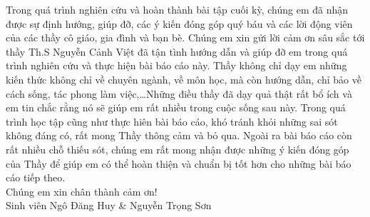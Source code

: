 
\begin{acknowledgements}
	\addchaptertocentry{\acknowledgementname}
	\thispagestyle{empty}
	Trong quá trình nghiên cứu và hoàn thành bài tập cuối kỳ, chúng em đã nhận được sự định hướng, giúp đỡ, các ý kiến đóng góp quý báu và các lời động viên của các thầy cô giáo, gia đình và bạn bè.
	Chúng em xin gửi lời cảm ơn sâu sắc tới thầy Th.S Nguyễn Cảnh Việt đã tận tình hướng dẫn và giúp đỡ em trong quá trình nghiên cứu và thực hiện bài báo cáo này. Thầy không chỉ dạy em những kiến thức không chỉ về chuyên ngành, về môn học, mà còn hướng dẫn, chỉ bảo về cách sống, tác phong làm việc,…Những điều thầy đã dạy quả thật rất bổ ích và em tin chắc rằng nó sẽ giúp em rất nhiều trong cuộc sống sau này.
	Trong quá trình học tập cũng như thực hiên bài báo cáo, khó tránh khỏi những sai sót không đáng có, rất mong Thầy thông cảm và bỏ qua. Ngoài ra bài báo cáo còn rất nhiều chỗ thiếu sót, chúng em rất mong nhận được những ý kiến đóng góp của Thầy để giúp em có thể hoàn thiện và chuẩn bị tốt hơn cho những bài báo cáo tiếp theo.\\
	Chúng em xin chân thành cảm ơn!\\
	
	\hfill Sinh viên Ngô Đăng Huy \& Nguyễn Trọng Sơn
\end{acknowledgements}